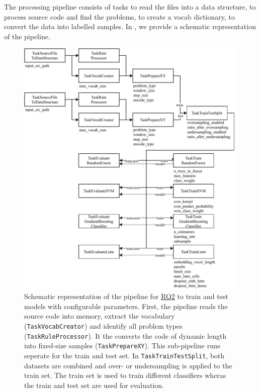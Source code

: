 The processing pipeline consists of tasks to read the files into a data structure, to process source code and find the problems, to create a vocab dictionary, to convert the data into labelled samples. In , we provide a schematic representation of the pipeline.

\begin{figure}
    \includegraphics[width=1\textwidth]{img/ML/Pipeline_RQ2.pdf}
    \caption[Schematic representation of the pipeline to train and test models.]{Schematic representation of the pipeline for \hyperref[rq:2]{RQ2} to train and test models with configurable parameters. First, the pipeline reads the source code into memory, extract the vocabulary (\texttt{TaskVocabCreator}) and identify all problem types (\texttt{TaskRuleProcessor}). It the converts the code of dynamic length into fixed-size samples (\texttt{TaskPrepareXY}). This sub-pipeline runs seperate for the train and test set. In \texttt{TaskTrainTestSplit}, both datasets are combined and over- or undersampling is applied to the train set. The train set is used to train different classifiers wheras the train and test set are used for evaluation.}
    \label{fig:pipeline_rq2}
\end{figure}


